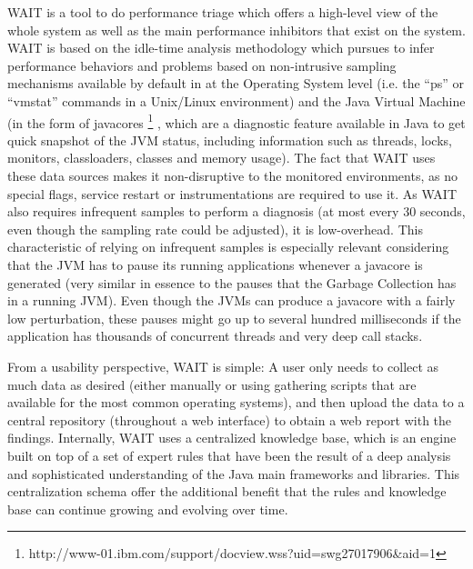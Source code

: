 \documentclass[runningheads,a4paper]{llncs}
\begin{document}
WAIT is a tool to do performance triage which offers a high-level view of
the whole system as well as the main performance inhibitors that exist on the
system. WAIT is based on the idle-time analysis methodology \cite{Altman2010}
which pursues to infer performance behaviors and problems based on non-intrusive sampling mechanisms
available by default in at the Operating System level (i.e. the ``ps'' or
``vmstat'' commands in a Unix/Linux environment) and the Java Virtual Machine
(in the form of javacores
\footnote{http://www-01.ibm.com/support/docview.wss?uid=swg27017906\&aid=1}
, which are a diagnostic feature available in Java to get quick snapshot of the
JVM status, including information such as threads, locks, monitors,
classloaders, classes and memory usage). The fact that WAIT uses these data
sources makes it non-disruptive to the monitored environments, as no special flags, 
service restart or instrumentations are required to use it. As WAIT also
requires infrequent samples to perform a diagnosis (at most every 30 seconds,
even though the sampling rate could be adjusted), it is low-overhead. This
characteristic of relying on infrequent samples is especially relevant considering 
that the JVM has to pause its running applications whenever a javacore is
generated (very similar in essence to the pauses that the Garbage Collection has in a 
running JVM). Even though the JVMs can produce a javacore with a fairly low
perturbation, these pauses might go up to several hundred milliseconds if the 
application has thousands of concurrent threads and very deep call stacks.

From a usability perspective, WAIT is simple: A user only needs to
collect as much data as desired (either manually or using gathering scripts
that are available for the most common operating systems), and then upload the
data to a central repository (throughout a web interface) to obtain a web 
report with the findings. Internally, WAIT uses a centralized knowledge base,
which is an engine built on top of a set of expert rules that have been the result of a 
deep analysis and sophisticated understanding of the Java main frameworks and
libraries. This centralization schema offer the additional benefit that
the rules and knowledge base can continue growing and evolving over time.
\end{document}
